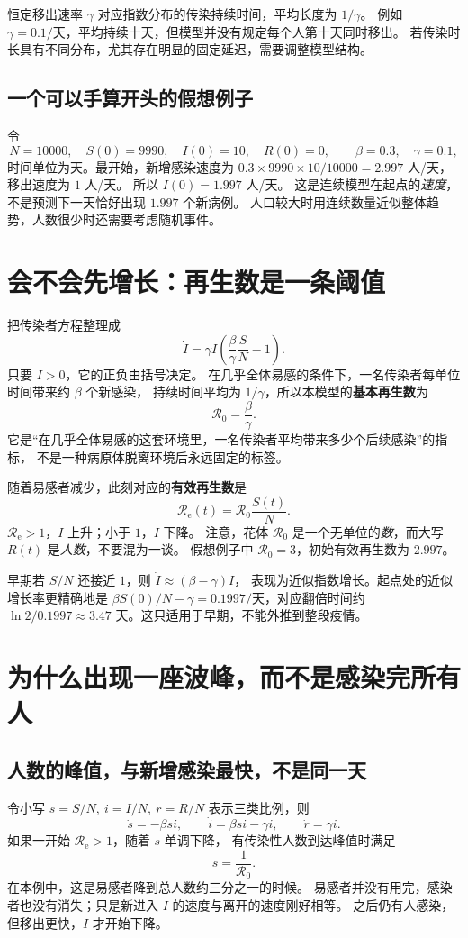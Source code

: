 \documentclass[UTF8,11pt,fontset=none]{ctexart}
\begin{document}
\begin{warnbox}
恒定移出速率 $\gamma$ 对应指数分布的传染持续时间，平均长度为 $1/\gamma$。
例如 $\gamma=0.1/\text{天}$，平均持续十天，但模型并没有规定每个人第十天同时移出。
若传染时长具有不同分布，尤其存在明显的固定延迟，需要调整模型结构。
\end{warnbox}

\subsection{一个可以手算开头的假想例子}
令
\[
N=10000,\quad S(0)=9990,\quad I(0)=10,\quad R(0)=0,
\qquad \beta=0.3,\quad\gamma=0.1,
\]
时间单位为天。最开始，新增感染速度为
$0.3\times9990\times10/10000=2.997$ 人/天，移出速度为 $1$ 人/天。
所以 $\dot I(0)=1.997$ 人/天。
这是连续模型在起点的\emph{速度}，不是预测下一天恰好出现 $1.997$ 个新病例。
人口较大时用连续数量近似整体趋势，人数很少时还需要考虑随机事件。

\section{会不会先增长：再生数是一条阈值}
把传染者方程整理成
\[
\dot I=\gamma I\left(\frac\beta\gamma\frac SN-1\right).
\]
只要 $I>0$，它的正负由括号决定。
在几乎全体易感的条件下，一名传染者每单位时间带来约 $\beta$ 个新感染，
持续时间平均为 $1/\gamma$，所以本模型的\textbf{基本再生数}为
\[
\boxed{\mathcal R_0=\frac\beta\gamma.}
\]
它是“在几乎全体易感的这套环境里，一名传染者平均带来多少个后续感染”的指标，
不是一种病原体脱离环境后永远固定的标签。

随着易感者减少，此刻对应的\textbf{有效再生数}是
\[
\mathcal R_{\mathrm e}(t)=\mathcal R_0\frac{S(t)}N.
\]
$\mathcal R_{\mathrm e}>1$，$I$ 上升；小于 $1$，$I$ 下降。
注意，花体 $\mathcal R_0$ 是一个无单位的\emph{数}，而大写 $R(t)$ 是\emph{人数}，不要混为一谈。
假想例子中 $\mathcal R_0=3$，初始有效再生数为 $2.997$。

早期若 $S/N$ 还接近 $1$，则 $\dot I\approx(\beta-\gamma)I$，
表现为近似指数增长。起点处的近似增长率更精确地是
$\beta S(0)/N-\gamma=0.1997/\text{天}$，对应翻倍时间约
$\ln2/0.1997\approx3.47$ 天。这只适用于早期，不能外推到整段疫情。

\section{为什么出现一座波峰，而不是感染完所有人}
\subsection{人数的峰值，与新增感染最快，不是同一天}
令小写 $s=S/N,\ i=I/N,\ r=R/N$ 表示三类比例，则
\[
\dot s=-\beta si,\qquad\dot i=\beta si-\gamma i,\qquad\dot r=\gamma i.
\]
如果一开始 $\mathcal R_{\mathrm e}>1$，随着 $s$ 单调下降，
有传染性人数到达峰值时满足
\[
\boxed{s=\frac1{\mathcal R_0}.}
\]
在本例中，这是易感者降到总人数约三分之一的时候。
易感者并没有用完，感染者也没有消失；只是新进入 $I$ 的速度与离开的速度刚好相等。
之后仍有人感染，但移出更快，$I$ 才开始下降。
\end{document}
